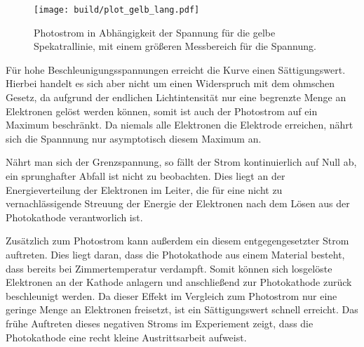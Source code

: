 \begin{figure} [H]
  \centering
  \texttt{[image: build/plot\_gelb\_lang.pdf]}
  \caption{Photostrom in Abhängigkeit der Spannung für die gelbe Spekatrallinie, mit einem
          größeren Messbereich für die Spannung.}
  \label{fig:gelb_lang}
\end{figure}

Für hohe Beschleunigungsspannungen erreicht die Kurve einen Sättigungswert. Hierbei handelt es sich aber nicht um einen
Widerspruch mit dem ohmschen Gesetz, da aufgrund der endlichen Lichtintensität nur eine begrenzte Menge an Elektronen
gelöst werden können, somit ist auch der Photostrom auf ein Maximum beschränkt.
Da niemals alle Elektronen die Elektrode erreichen, nährt sich die Spannnung nur asymptotisch diesem Maximum an.

Nährt man sich der Grenzspannung, so fällt der Strom kontinuierlich auf Null ab, ein sprunghafter Abfall ist
nicht zu beobachten.
Dies liegt an der Energieverteilung der Elektronen im Leiter, die für eine nicht zu vernachlässigende Streuung
der Energie der Elektronen nach dem Lösen aus der Photokathode verantworlich ist.

Zusätzlich zum Photostrom kann außerdem ein diesem entgegengesetzter Strom auftreten. Dies liegt daran,
dass die Photokathode aus einem Material besteht, dass bereits bei Zimmertemperatur verdampft.
Somit können sich losgelöste Elektronen an der Kathode anlagern und anschließend zur Photokathode zurück beschleunigt werden.
Da dieser Effekt im Vergleich zum Photostrom nur eine geringe Menge an Elektronen freisetzt, ist
ein Sättigungswert schnell erreicht.
Das frühe Auftreten dieses negativen Stroms im Experiement zeigt, dass die Photokathode eine recht kleine
Austrittsarbeit aufweist.